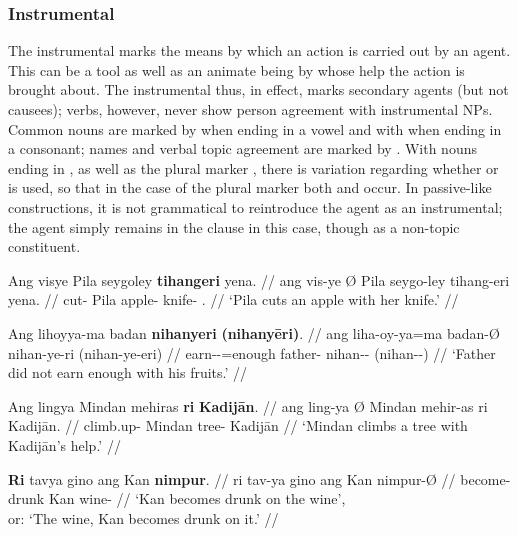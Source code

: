 
\subsubsection{Instrumental}
\label{subsubsec:instrumental}

The instrumental marks the means by which an action is carried out by an agent.
This can be a tool as well as an animate being by whose help the action is
brought about. The instrumental thus, in effect, marks secondary agents (but
not causees); verbs, however, never show person agreement with instrumental
NPs. Common nouns are marked by  when ending in a vowel and with
 when ending in a consonant; names and verbal topic agreement
are marked by . With nouns ending in , as well as the
plural marker , there is variation regarding whether
 or  is used, so that in the case of the plural
marker both  and  occur. In passive-like
constructions, it is not grammatical to reintroduce the agent as an
instrumental; the agent simply remains in the clause in this case, though as a
non-topic constituent.

\pex
\a\begingl
	\gla Ang visye {} Pila seygoley \textbf{tihangeri} yena. //
	\glb ang vis-ye Ø Pila seygo-ley tihang-eri yena. //
	\glc \AgtT{} cut-\TsgF{} \Top{} Pila apple-\PargI{} 
		knife-\Ins{} \TsgF{}.\Gen{} //
	\glft `Pila cuts an apple with her knife.' //
\endgl

\a\begingl
	\gla Ang lihoyya-ma badan \textbf{nihanyeri} \textbf{(nihanyēri)}. //
	\glb ang liha-oy-ya=ma badan-Ø nihan-ye-ri (nihan-ye-eri) //
	\glc \AgtT{} earn-\Neg{}-\TsgM{}=enough father-\Top{} 
		nihan-\Pl{}-\Ins{} (nihan-\Pl{}-\Ins) //
	\glft `Father did not earn enough with his fruits.' //
\endgl

\a\begingl
	\gla Ang lingya {} Mindan mehiras \textbf{ri} \textbf{Kadijān}. //
	\glb ang ling-ya Ø Mindan mehir-as ri Kadijān. //
	\glc \AgtT{} climb.up-\TsgM{} \Top{} Mindan tree-\Parg{} 
		\Ins{} Kadijān //
	\glft `Mindan climbs a tree with Kadijān's help.' //
\endgl

\a\begingl
	\gla \textbf{Ri} tavya gino ang Kan \textbf{nimpur}. //
	\glb ri tav-ya gino ang Kan nimpur-Ø //
	\glc \InsT{} become-\TsgM{} drunk \Aarg{} Kan wine-\Top{} //
	\glft `Kan becomes drunk on the wine', \\
		or: `The wine, Kan becomes drunk on it.' //
\endgl

